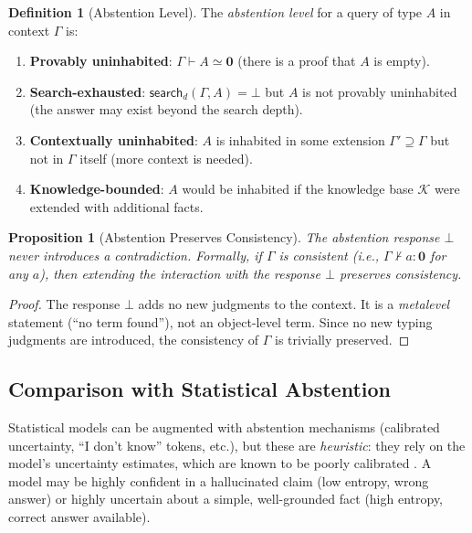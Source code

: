 \documentclass[11pt,a4paper]{article}
\theoremstyle{plain}
\newtheorem{proposition}[theorem]{Proposition}
\theoremstyle{definition}
\newtheorem{definition}[theorem]{Definition}
\theoremstyle{remark}
\begin{document}
\begin{definition}[Abstention Level]\label{def:abstention-levels}
The \emph{abstention level} for a query of type $A$ in context $\Gamma$ is:
\begin{enumerate}[nosep,label=(\roman*)]
  \item \textbf{Provably uninhabited}: $\Gamma \vdash A \simeq \mathbf{0}$ (there is a proof that $A$ is empty).
  \item \textbf{Search-exhausted}: $\mathsf{search}_d(\Gamma, A) = \bot$ but $A$ is not provably uninhabited (the answer may exist beyond the search depth).
  \item \textbf{Contextually uninhabited}: $A$ is inhabited in some extension $\Gamma' \supseteq \Gamma$ but not in $\Gamma$ itself (more context is needed).
  \item \textbf{Knowledge-bounded}: $A$ would be inhabited if the knowledge base $\mathcal{K}$ were extended with additional facts.
\end{enumerate}
\end{definition}

\begin{proposition}[Abstention Preserves Consistency]\label{prop:consistency}
The abstention response $\bot$ never introduces a contradiction.
Formally, if $\Gamma$ is consistent (i.e., $\Gamma \nvdash a : \mathbf{0}$ for any $a$), then extending the interaction with the response $\bot$ preserves consistency.
\end{proposition}

\begin{proof}
The response $\bot$ adds no new judgments to the context.
It is a \emph{metalevel} statement (``no term found''), not an object-level term.
Since no new typing judgments are introduced, the consistency of $\Gamma$ is trivially preserved.
\end{proof}

\subsection{Comparison with Statistical Abstention}

Statistical models can be augmented with abstention mechanisms (calibrated uncertainty, ``I don't know'' tokens, etc.), but these are \emph{heuristic}: they rely on the model's uncertainty estimates, which are known to be poorly calibrated \cite{guo2017calibration}.
A model may be highly confident in a hallucinated claim (low entropy, wrong answer) or highly uncertain about a simple, well-grounded fact (high entropy, correct answer available).
\end{document}
